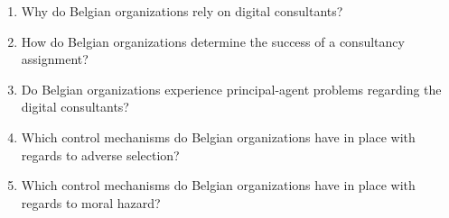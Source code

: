 \documentclass[12pt]{article}
\begin{document}
\begin{enumerate}
\def\labelenumi{\arabic{enumi}.}
\item
  Why do Belgian organizations rely on digital consultants?
\item
  How do Belgian organizations determine the success of a consultancy
  assignment?
\item
  Do Belgian organizations experience principal-agent problems regarding
  the digital consultants?
\item
  Which control mechanisms do Belgian organizations have in place with
  regards to adverse selection?
\item
  Which control mechanisms do Belgian organizations have in place with
  regards to moral hazard?
\end{enumerate}


\renewcommand\refname{References}

\end{document}
